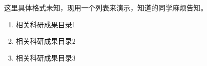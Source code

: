 
\ResearchResult %

这里具体格式未知，现用一个列表来演示，知道的同学麻烦告知。
\begin{enumerate}
	\item
	相关科研成果目录1
	\item 
	相关科研成果目录2
	\item 
	相关科研成果目录3
	
	
	
\end{enumerate}


